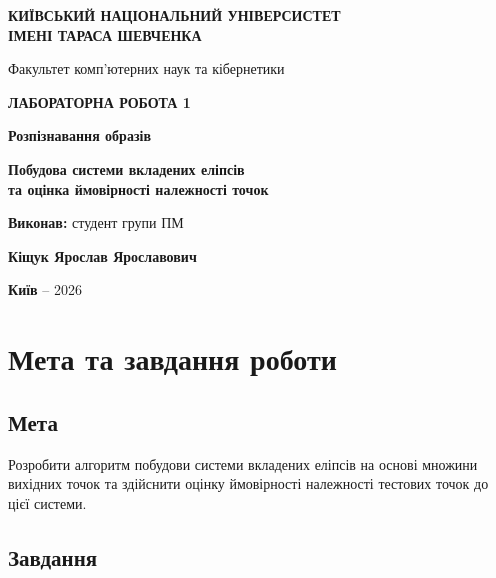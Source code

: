 \documentclass[12pt,a4paper]{article}
\begin{document}
\begin{titlepage}
\centering
{\Large \textbf{КИЇВСЬКИЙ НАЦІОНАЛЬНИЙ УНІВЕРСИСТЕТ\\
ІМЕНІ ТАРАСА ШЕВЧЕНКА}}

\vspace{2cm}

{\large Факультет комп'ютерних наук та кібернетики}

\vspace{3cm}

{\Large \textbf{ЛАБОРАТОРНА РОБОТА 1}}

\vspace{0.5cm}

{\large \textbf{Розпізнавання образів}}

\vspace{2cm}

{\large \textbf{Побудова системи вкладених еліпсів\\
та оцінка ймовірності належності точок}}

\vspace{3cm}

{\large \textbf{Виконав:} студент групи ПМ}

\vspace{0.5cm}

{\Large \textbf{Кіщук Ярослав Ярославович}}

\vspace{3cm}

{\large \textbf{Київ} -- 2026}

\end{titlepage}

\newpage
\tableofcontents
\newpage

\section{Мета та завдання роботи}

\subsection{Мета}
Розробити алгоритм побудови системи вкладених еліпсів на основі множини вихідних точок та здійснити оцінку ймовірності належності тестових точок до цієї системи.

\subsection{Завдання}
\end{document}
